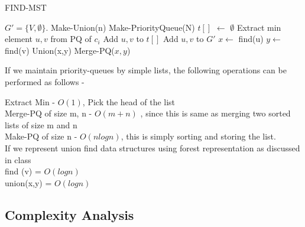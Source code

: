 \documentclass[12pt]{article}
\newcommand*\Let[2]{\State #1 $\gets$ #2}
\begin{document}
\begin{algorithm}[H]
  \caption{FIND-MST}
  \begin{algorithmic}[1]
		\State $G' =  \{V , \emptyset \}$.
		\State Make-Union(n) 
		\State Make-PriorityQueue(N) 
			\Let {$t \left[\right]$}{$\emptyset$}
				\State Extract min element ${u,v}$ from PQ of $c_i$
				\State Add $u,v$ to $t\left[\right]$
			\EndFor
				\State Add $u,v$ to $G'$
				\State $x \gets$ find(u)
				\State $y \gets$ find(v)
				\State Union(x,y)
				\State Merge-PQ($x,y$)
			\EndFor
		\EndWhile
		\State {}
	\EndFunction
  \end{algorithmic}
\end{algorithm}


If we maintain priority-queues by simple lists, the following operations can be performed as follows - 

Extract Min - $O(1)$, Pick the head of the list\\
Merge-PQ of size m, n -  $O(m+n)$ , since this is same as merging two sorted lists of size m and n \\
Make-PQ of size n - $O(nlogn)$, this is simply sorting and storing the list.\\

If we represent union find data structures using forest representation as discussed in class\\
find (v) = $O(logn)$\\
union(x,y) = $O(logn)$\\

\subsection{Complexity Analysis}
\end{document}
